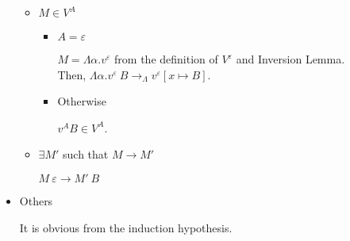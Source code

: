 \begin{itemize}
	      \begin{itemize}
	      	\item $ M \in V^A $
	      	      	      	      	      	      	      	      	      	      	      	      	      	      	      	      		      	      	      	      	      	      	      	      
	      	      \begin{itemize}
	      	      	\item $A=\varepsilon$
	      	      	      	      	      	      	      	      	      	      	      	      	      	      	      	      	      	      	      	      	      	      	      	      		      	      	      	      	      	      	      	      	      	      	      	      
	      	      	      $M = \Lambda\alpha.v^\varepsilon$ from the definition of $V^\varepsilon$ and Inversion Lemma.\\
	      	      	      Then, $\Lambda\alpha.v^\varepsilon\ B \longrightarrow_\Lambda v^\varepsilon[x\mapsto B]$.
	      	      	      	      	      	      	      	      	      	      	      	      	      	      	      	      	      	      	      	      	      	      	      	      		      	      	      	      	      	      	      	      	      	      	      	      
	      	      	\item Otherwise
	      	      	      	      	      	      	      	      	      	      	      	      	      	      	      	      	      	      	      	      	      	      	      	      		      	      	      	      	      	      	      	      	      	      	      	      
	      	      	      $v^A B \in V^A$.
	      	      \end{itemize}
	      	      	      	      	      	      	      	      	      	      	      	      	      	      	      	      		      	      	      	      	      	      	      	      
	      	\item $\exists M'$ such that $M \longrightarrow M'$
	      	      	      	      	      	      	      	      	      	      	      	      	      	      	      	      		      	      	      	      	      	      	      	      
	      	      $M\ \varepsilon \longrightarrow M'\ B$
	      \end{itemize}
	      	      	      	      	      	      	      	      		      	      	      	      
	\item Others
	      	      	      	      	      	      	      	      		      	      	      	      
	      It is obvious from the induction hypothesis.
	      	      	      	      	      	      	      	      		      	      	      	      
\end{itemize}
	
